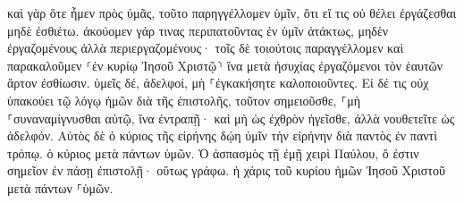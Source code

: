 \documentclass{openreader}
\begin{document}
καὶ γὰρ ὅτε ἦμεν πρὸς ὑμᾶς, τοῦτο παρηγγέλλομεν ὑμῖν, ὅτι εἴ τις οὐ θέλει ἐργάζεσθαι μηδὲ ἐσθιέτω. 
ἀκούομεν γάρ τινας περιπατοῦντας ἐν ὑμῖν ἀτάκτως, μηδὲν ἐργαζομένους ἀλλὰ περιεργαζομένους· 
τοῖς δὲ τοιούτοις παραγγέλλομεν καὶ παρακαλοῦμεν ⸂ἐν κυρίῳ Ἰησοῦ Χριστῷ⸃ ἵνα μετὰ ἡσυχίας ἐργαζόμενοι τὸν ἑαυτῶν ἄρτον ἐσθίωσιν. 
ὑμεῖς δέ, ἀδελφοί, μὴ ⸀ἐγκακήσητε καλοποιοῦντες. 
Εἰ δέ τις οὐχ ὑπακούει τῷ λόγῳ ἡμῶν διὰ τῆς ἐπιστολῆς, τοῦτον σημειοῦσθε, ⸀μὴ ⸀συναναμίγνυσθαι αὐτῷ, ἵνα ἐντραπῇ· 
καὶ μὴ ὡς ἐχθρὸν ἡγεῖσθε, ἀλλὰ νουθετεῖτε ὡς ἀδελφόν. 
Αὐτὸς δὲ ὁ κύριος τῆς εἰρήνης δῴη ὑμῖν τὴν εἰρήνην διὰ παντὸς ἐν παντὶ τρόπῳ. ὁ κύριος μετὰ πάντων ὑμῶν. 
Ὁ ἀσπασμὸς τῇ ἐμῇ χειρὶ Παύλου, ὅ ἐστιν σημεῖον ἐν πάσῃ ἐπιστολῇ· οὕτως γράφω. 
ἡ χάρις τοῦ κυρίου ἡμῶν Ἰησοῦ Χριστοῦ μετὰ πάντων ⸀ὑμῶν. 
\end{document}
